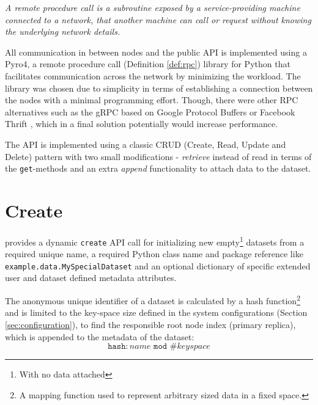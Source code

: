\begin{definition}[RPC] \label{def:rpc}
\textit{A remote procedure call is a subroutine exposed by a service-providing machine connected to a network, that another machine can call or request without knowing the underlying network details.}
\end{definition}
\vspace*{3mm}

All communication in \CodeName between nodes and the public API is implemented using a Pyro4\cite{PagePyro4}, a remote procedure call (Definition \ref{def:rpc}) library for Python that facilitates communication across the network by minimizing the workload. The library was chosen due to simplicity in terms of establishing a connection between the nodes with a minimal programming effort. Though, there were other RPC alternatives such as the gRPC \cite{PageGRPC} based on Google Protocol Buffers \cite{PageProtocolBuffers} or Facebook Thrift \cite{slee2007thrift}, which in a final solution potentially would increase performance.
\newline

The API is implemented using a classic CRUD (Create, Read, Update and Delete) pattern with two small modifications - \textit{retrieve} instead of read in terms of the \texttt{get}-methods and an extra \textit{append} functionality to attach data to the dataset.

\section{Create} \label{sec:api-create}
\CodeName provides a dynamic \texttt{create} API call for initializing new empty\footnote{With no data attached} datasets from a required unique name, a required Python class name and package reference like \texttt{example.data.MySpecialDataset} and an optional dictionary of specific extended user and dataset defined metadata attributes.
\newline

The anonymous unique identifier of a dataset is calculated by a hash function\footnote{A mapping function used to represent arbitrary sized data in a fixed space.} and is limited to the key-space size defined in the system configurations (Section \ref{sec:configuration}), to find the responsible root node index (primary replica), which is appended to the metadata of the dataset:
\begin{equation}
	\texttt{hash}:name \texttt{ mod } \texttt{\#}keyspace
\end{equation}

